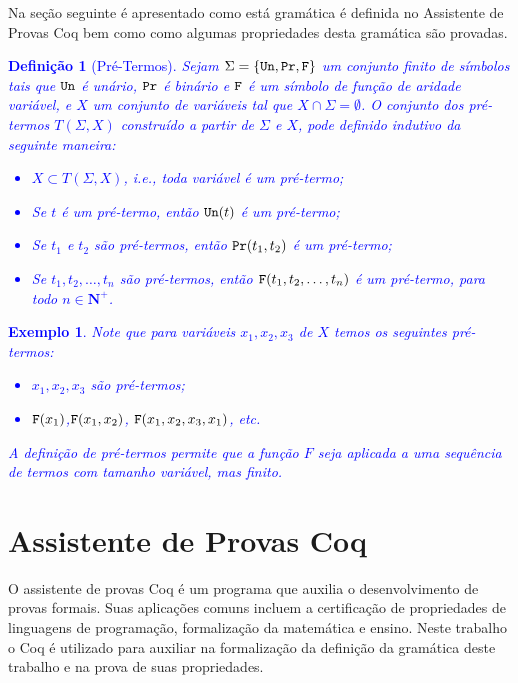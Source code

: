 \documentclass{article}
\newcommand{\nantes}[1]{\textcolor{blue}{#1}}
\newcommand{\tty}[1]{{\tt #1}}
\newtheorem{defi}{Definição}
\newtheorem{exam}{Exemplo}
\begin{document}
Na seção seguinte é apresentado como está gramática é definida no Assistente de Provas Coq bem como como algumas propriedades desta gramática são provadas.

\nantes{
\begin{defi}[Pré-Termos]
Sejam $\Sigma=\{\tty{Un},{\tt Pr},{\tt F}\}$ um conjunto finito de símbolos tais que $\tty{Un}$ é unário, $\tty{Pr}$ é binário e $\tty{F}$ é um símbolo de função de aridade variável, e $X$ um conjunto de variáveis tal que $X\cap \Sigma=\emptyset$. O conjunto dos pré-termos $T(\Sigma,X)$ construído a partir de $\Sigma$ e $X$, pode definido indutivo da seguinte maneira:
\begin{itemize}
    \item $X\subset T(\Sigma,X)$, i.e., toda variável é um pré-termo;
    \item Se $t$ é um pré-termo, então $\tty{Un}(t)$ é um pré-termo;
    \item Se $t_1$ e $t_2$ são  pré-termos, então $\tty{Pr}(t_1,t_2)$ é um pré-termo;
     \item Se $t_1, t_2, \ldots, t_n$ são  pré-termos, então $\tty{F}(t_1,t_2,\ldots, t_n)$ é um pré-termo, para todo $n\in \mathbf{N}^+$.
\end{itemize}
\end{defi}
}


\nantes{
\begin{exam}
Note que para variáveis $x_1,x_2,x_3$ de $X$ temos os seguintes pré-termos:
\begin{itemize}
    \item $x_1,x_2,x_3$ são pré-termos;
    \item $\tty{F}(x_1)$,$\tty{F}(x_1,x_2)$, $\tty{F}(x_1,x_2,x_3,x_1)$, etc.
\end{itemize}
A definição de pré-termos permite que a função $F$ seja aplicada a uma sequência de termos com tamanho variável, mas finito.
\end{exam}
}
\section{Assistente de Provas Coq}
\label{section:assistente_coq}

O assistente de provas Coq é um programa que auxilia o desenvolvimento de provas formais. Suas
aplicações comuns incluem a certificação de propriedades de linguagens de programação, %
formalização da matemática e ensino. Neste trabalho o Coq é utilizado para auxiliar na formalização da
definição da gramática deste trabalho e na prova de suas propriedades.
\end{document}
